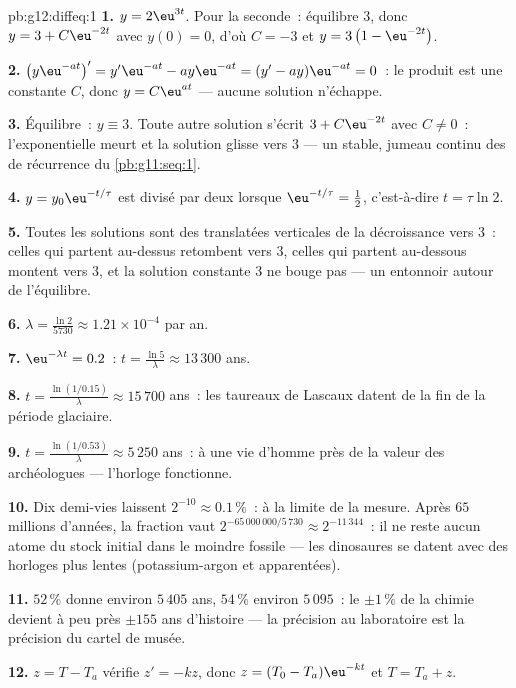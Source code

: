 \begin{solution}{pb:g12:diffeq:1}
\textbf{1.} $y = 2\eu^{3t}$. Pour la seconde~: équilibre $3$, donc
$y = 3 + C\eu^{-2t}$ avec $y(0) = 0$, d'où $C = -3$ et
$y = 3\left(1 - \eu^{-2t}\right)$.

\textbf{2.} $\left(y\eu^{-at}\right)' = y'\eu^{-at} -
ay\eu^{-at} = (y' - ay)\eu^{-at} = 0$~: le produit est une
constante $C$, donc $y = C\eu^{at}$ --- aucune solution
n'échappe.

\textbf{3.} Équilibre~: $y \equiv 3$. Toute autre solution s'écrit
$3 + C\eu^{-2t}$ avec $C \neq 0$~: l'exponentielle meurt et la
solution glisse vers $3$ --- un  stable, jumeau continu
des  de récurrence du \cref{pb:g11:seq:1}.

\textbf{4.} $y = y_0\eu^{-t/\tau}$ est divisé par deux lorsque
$\eu^{-t/\tau} = \frac12$, c'est-à-dire $t = \tau\ln 2$.

\textbf{5.} Toutes les solutions sont des translatées verticales de
la décroissance vers $3$~: celles qui partent au-dessus retombent
vers $3$, celles qui partent au-dessous montent vers $3$, et la
solution constante $3$ ne bouge pas --- un entonnoir autour de
l'équilibre.

\textbf{6.} $\lambda = \frac{\ln 2}{5730} \approx 1.21 \times
10^{-4}$ par an.

\textbf{7.} $\eu^{-\lambda t} = 0.2$~:
$t = \frac{\ln 5}{\lambda} \approx 13\,300$ ans.

\textbf{8.} $t = \frac{\ln(1/0.15)}{\lambda} \approx 15\,700$
ans~: les taureaux de Lascaux datent de la fin de la période
glaciaire.

\textbf{9.} $t = \frac{\ln(1/0.53)}{\lambda} \approx 5\,250$ ans~:
à une vie d'homme près de la valeur des archéologues --- l'horloge
fonctionne.

\textbf{10.} Dix demi-vies laissent $2^{-10} \approx 0.1\,\%$~: à
la limite de la mesure. Après $65$ millions d'années, la fraction
vaut $2^{-65\,000\,000/5\,730} \approx 2^{-11\,344}$~: il ne reste
aucun atome du stock initial dans le moindre fossile --- les
dinosaures se datent avec des horloges plus lentes
(potassium-argon et apparentées).

\textbf{11.} $52\,\%$ donne environ $5\,405$ ans, $54\,\%$ environ
$5\,095$~: le $\pm 1\,\%$ de la chimie devient à peu près
$\pm 155$ ans d'histoire --- la précision au laboratoire est la
précision du cartel de musée.

\textbf{12.} $z = T - T_a$ vérifie $z' = -kz$, donc
$z = (T_0 - T_a)\eu^{-kt}$ et $T = T_a + z$.


\end{solution}
